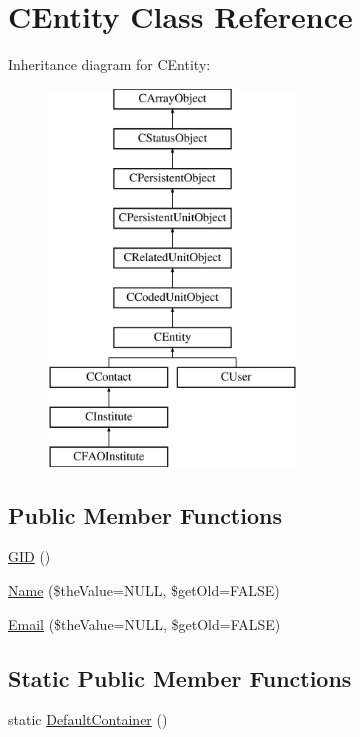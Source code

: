\hypertarget{class_c_entity}{\section{C\-Entity Class Reference}
\label{class_c_entity}
}
Inheritance diagram for C\-Entity\-:\begin{figure}[H]
\begin{center}
\leavevmode
\includegraphics[height=10.000000cm]{class_c_entity}
\end{center}
\end{figure}
\subsection*{Public Member Functions}
\begin{DoxyCompactItemize}
\item 
\hyperlink{class_c_entity_a92cac9118e8d52f5f659dead5fc652a2}{G\-I\-D} ()
\item 
\hyperlink{class_c_entity_ace5878c009baf09d85c8ca115c48dbb0}{Name} (\$the\-Value=N\-U\-L\-L, \$get\-Old=F\-A\-L\-S\-E)
\item 
\hyperlink{class_c_entity_acf65b6fb2f4195f6c649b4ca506c7899}{Email} (\$the\-Value=N\-U\-L\-L, \$get\-Old=F\-A\-L\-S\-E)
\end{DoxyCompactItemize}
\subsection*{Static Public Member Functions}
\begin{DoxyCompactItemize}
\item 
static \hyperlink{class_c_entity_a260a4c309aff31a42d0e23b372f9b209}{Default\-Container} ()
\end{DoxyCompactItemize}
